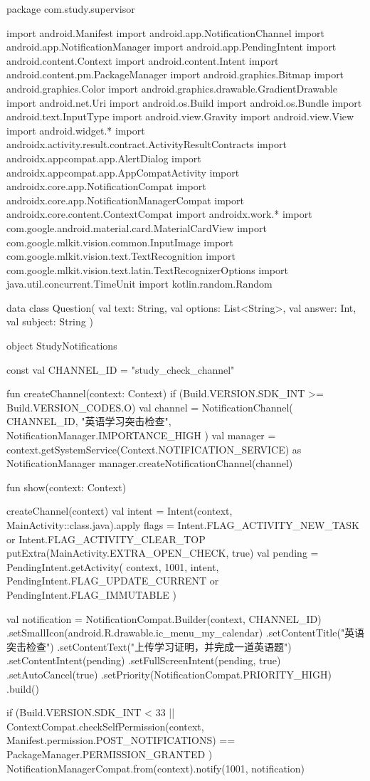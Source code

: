 package com.study.supervisor

import android.Manifest
import android.app.NotificationChannel
import android.app.NotificationManager
import android.app.PendingIntent
import android.content.Context
import android.content.Intent
import android.content.pm.PackageManager
import android.graphics.Bitmap
import android.graphics.Color
import android.graphics.drawable.GradientDrawable
import android.net.Uri
import android.os.Build
import android.os.Bundle
import android.text.InputType
import android.view.Gravity
import android.view.View
import android.widget.*
import androidx.activity.result.contract.ActivityResultContracts
import androidx.appcompat.app.AlertDialog
import androidx.appcompat.app.AppCompatActivity
import androidx.core.app.NotificationCompat
import androidx.core.app.NotificationManagerCompat
import androidx.core.content.ContextCompat
import androidx.work.*
import com.google.android.material.card.MaterialCardView
import com.google.mlkit.vision.common.InputImage
import com.google.mlkit.vision.text.TextRecognition
import com.google.mlkit.vision.text.latin.TextRecognizerOptions
import java.util.concurrent.TimeUnit
import kotlin.random.Random

data class Question(
    val text: String,
    val options: List<String>,
    val answer: Int,
    val subject: String
)

object StudyNotifications {
    const val CHANNEL_ID = "study_check_channel"

    fun createChannel(context: Context) {
        if (Build.VERSION.SDK_INT >= Build.VERSION_CODES.O) {
            val channel = NotificationChannel(
                CHANNEL_ID,
                "英语学习突击检查",
                NotificationManager.IMPORTANCE_HIGH
            )
            val manager = context.getSystemService(Context.NOTIFICATION_SERVICE) as NotificationManager
            manager.createNotificationChannel(channel)
        }
    }

    fun show(context: Context) {
        createChannel(context)
        val intent = Intent(context, MainActivity::class.java).apply {
            flags = Intent.FLAG_ACTIVITY_NEW_TASK or Intent.FLAG_ACTIVITY_CLEAR_TOP
            putExtra(MainActivity.EXTRA_OPEN_CHECK, true)
        }
        val pending = PendingIntent.getActivity(
            context, 1001, intent,
            PendingIntent.FLAG_UPDATE_CURRENT or PendingIntent.FLAG_IMMUTABLE
        )

        val notification = NotificationCompat.Builder(context, CHANNEL_ID)
            .setSmallIcon(android.R.drawable.ic_menu_my_calendar)
            .setContentTitle("英语突击检查")
            .setContentText("上传学习证明，并完成一道英语题")
            .setContentIntent(pending)
            .setFullScreenIntent(pending, true)
            .setAutoCancel(true)
            .setPriority(NotificationCompat.PRIORITY_HIGH)
            .build()

        if (Build.VERSION.SDK_INT < 33 ||
            ContextCompat.checkSelfPermission(context, Manifest.permission.POST_NOTIFICATIONS) ==
            PackageManager.PERMISSION_GRANTED
        ) {
            NotificationManagerCompat.from(context).notify(1001, notification)
        }
    }
}

